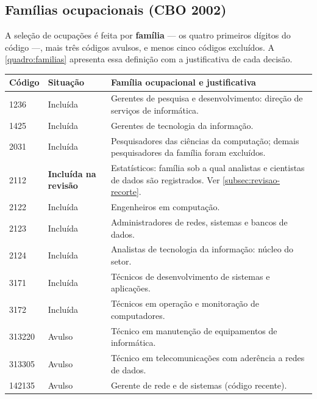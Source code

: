 \begin{apendicesenv}
\section{Famílias ocupacionais (CBO 2002)}

A seleção de ocupações é feita por \textbf{família} --- os quatro primeiros dígitos do código ---, mais três códigos avulsos, e menos cinco códigos excluídos. A \autoref{quadro:familias} apresenta essa definição com a justificativa de cada decisão.

\begin{quadro}[H]
    \centering
    \caption{Famílias e códigos CBO que definem a ocupação de tecnologia}
    \label{quadro:familias}
    \footnotesize
    \renewcommand{\arraystretch}{1.25}
    \begin{tabular}{llp{7.6cm}}
        \toprule
        \rowcolor{black!8}
        \textbf{Código} & \textbf{Situação} & \textbf{Família ocupacional e justificativa} \\
        \midrule
        1236   & Incluída & Gerentes de pesquisa e desenvolvimento: direção de serviços de informática. \\
        1425   & Incluída & Gerentes de tecnologia da informação. \\
        2031   & Incluída & Pesquisadores das ciências da computação; demais pesquisadores da família foram excluídos. \\
        2112   & \textbf{Incluída na revisão} & Estatísticos: família sob a qual analistas e cientistas de dados são registrados. Ver \autoref{subsec:revisao-recorte}. \\
        2122   & Incluída & Engenheiros em computação. \\
        2123   & Incluída & Administradores de redes, sistemas e bancos de dados. \\
        2124   & Incluída & Analistas de tecnologia da informação: núcleo do setor. \\
        3171   & Incluída & Técnicos de desenvolvimento de sistemas e aplicações. \\
        3172   & Incluída & Técnicos em operação e monitoração de computadores. \\
        \midrule
        313220 & Avulso   & Técnico em manutenção de equipamentos de informática. \\
        313305 & Avulso   & Técnico em telecomunicações com aderência a redes de dados. \\
        142135 & Avulso   & Gerente de rede e de sistemas (código recente). \\

\end{tabular}
\end{quadro}
\end{apendicesenv}
